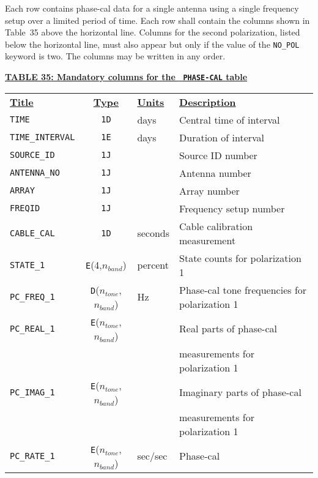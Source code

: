 \documentclass[twoside]{article}
\newcommand{\Hi}[1]{\textcolor{hicol}{#1}}
\newcommand{\nband}{$n_{band}$}
\newcommand{\ntone}{$n_{tone}$}
\begin{document}
Each row contains phase-cal data for a single antenna using a single
frequency setup over a limited period of time.  Each row shall contain
the columns shown in Table~\Hi{35 above the horizontal line.  Columns
for the second polarization, listed below the horizontal line, must
also appear but only if the value of the {\tt NO\_POL} keyword is
two.}  The columns may be written in any order.
\begin{center}
\underline{\bf{TABLE \Hi{35}: Mandatory columns for the {\tt
      PHASE-CAL} table}}\\
\begin{tabular}{lcll}
\noalign{\vspace{2pt}}
\underline{{\bf Title\vphantom{y}}} & \underline{\bf{Type}} &
   \underline{{\bf Units\vphantom{y}}} & \underline{\bf{Description}} \\
\noalign{\vspace{2pt}}
{\tt TIME}        & {\tt 1D} & days  & Central time of interval \\
{\tt TIME\_INTERVAL} & {\tt 1E} & days & Duration of interval \\
{\tt SOURCE\_ID}  & {\tt 1J} &       & Source ID number \\
{\tt ANTENNA\_NO} & {\tt 1J} &       & Antenna number \\
{\tt ARRAY}       & {\tt 1J} &       & Array number \\
{\tt FREQID}      & {\tt 1J} &       & Frequency setup number \\
{\tt CABLE\_CAL}  & {\tt 1\Hi{D}} & seconds & Cable calibration measurement \\
{\tt STATE\_1}    & \Hi{{\tt E}}(4,\nband) & percent & State counts for
                                         polarization 1 \\
{\tt PC\_FREQ\_1} & {\tt D}(\ntone,\nband) & Hz & Phase-cal tone
                                        frequencies for polarization 1 \\
{\tt PC\_REAL\_1} & {\tt E}(\ntone,\nband) &    & Real parts of phase-cal \\
                  & & &\hspace{1em} measurements for polarization 1 \\
{\tt PC\_IMAG\_1} & {\tt E}(\ntone,\nband) &    & Imaginary parts of phase-cal \\
                  & & &\hspace{1em} measurements for polarization 1 \\
{\tt PC\_RATE\_1} & {\tt E}(\ntone,\nband) & sec/sec & Phase-cal

\end{tabular}
\end{center}
\end{document}
